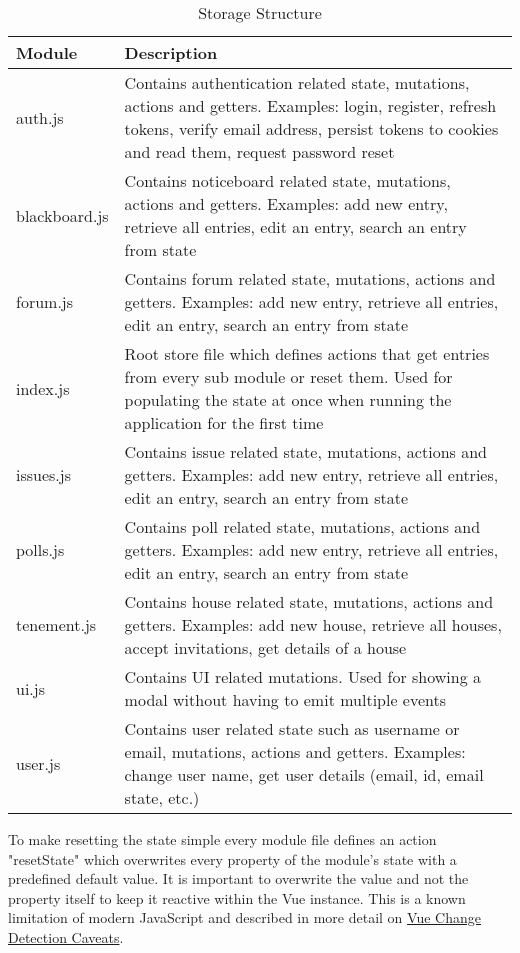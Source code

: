 \begin{table}[H]
  \begin{tabularx}{\linewidth}{|l|X|}
      \hline
      \textbf{Module} & \textbf{Description} \\
      \hline
      auth.js & Contains authentication related state, mutations, actions and getters. Examples: login, register, refresh tokens, verify email address, persist tokens to cookies and read them, request password reset  \\
      \hline
      blackboard.js & Contains noticeboard related state, mutations, actions and getters. Examples: add new entry, retrieve all entries, edit an entry, search an entry from state \\
      \hline
      forum.js & Contains forum related state, mutations, actions and getters. Examples: add new entry, retrieve all entries, edit an entry, search an entry from state  \\
      \hline
      index.js & Root store file which defines actions that get entries from every sub module or reset them. Used for populating the state at once when running the application for the first time \\
      \hline
      issues.js & Contains issue related state, mutations, actions and getters. Examples: add new entry, retrieve all entries, edit an entry, search an entry from state  \\
      \hline
      polls.js & Contains poll related state, mutations, actions and getters. Examples: add new entry, retrieve all entries, edit an entry, search an entry from state \\
      \hline
      tenement.js & Contains house related state, mutations, actions and getters. Examples: add new house, retrieve all houses, accept invitations, get details of a house  \\
      \hline
      ui.js & Contains UI related mutations. Used for showing a modal without having to emit multiple events  \\
      \hline
      user.js & Contains user related state such as username or email, mutations, actions and getters. Examples: change user name, get user details (email, id, email state, etc.) \\
      \hline
  \end{tabularx}
  \caption{Storage Structure}
  \label{table:storagestructure}
\end{table}

To make resetting the state simple every module file defines an action "resetState" which overwrites every property of the module's state with a predefined default value. It is important to overwrite the value and not the property itself to keep it reactive within the Vue instance. This is a known limitation of modern JavaScript and described in more detail on \href{https://vuejs.org/v2/guide/reactivity.html#Change-Detection-Caveats}{Vue Change Detection Caveats}.

